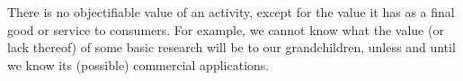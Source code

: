 There is no objectifiable value of an activity, except for the value it has as a final good or service to consumers.
For example, we cannot know what the value (or lack thereof) of some basic research will be to our grandchildren, unless and until we know its (possible) commercial applications.